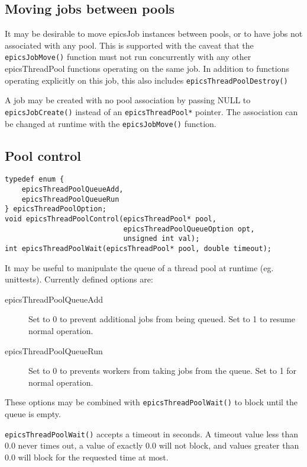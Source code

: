 \subsection{Moving jobs between pools}

It may be desirable to move epicsJob instances between pools, or to
have jobs not associated with any pool. This is supported with the
caveat that the \verb|epicsJobMove()| function must not run concurrently
with any other epicsThreadPool functions operating on the same job.
In addition to functions operating explicitly on this job, this also includes
\verb|epicsThreadPoolDestroy()|

A job may be created with no pool association by passing NULL to \verb|epicsJobCreate()|
instead of an \verb|epicsThreadPool*| pointer. The association can be changed
at runtime with the \verb|epicsJobMove()| function.


\subsection{Pool control}

\begin{verbatim}
typedef enum {
    epicsThreadPoolQueueAdd,
    epicsThreadPoolQueueRun
} epicsThreadPoolOption;
void epicsThreadPoolControl(epicsThreadPool* pool,
                            epicsThreadPoolQueueOption opt,
                            unsigned int val);
int epicsThreadPoolWait(epicsThreadPool* pool, double timeout);
\end{verbatim}



It may be useful to manipulate the queue of a thread pool at runtime
(eg. unittests). Currently defined options are:
\begin{description}
\item [{epicsThreadPoolQueueAdd}] Set to 0 to prevent additional jobs from
being queued. Set to 1 to resume normal operation.
\item [{epicsThreadPoolQueueRun}] Set to 0 to prevents workers from taking
jobs from the queue. Set to 1 for normal operation.
\end{description}
These options may be combined with \verb|epicsThreadPoolWait()| to block
until the queue is empty.

\verb|epicsThreadPoolWait()| accepts a timeout in seconds. A timeout value
less than 0.0 never times out, a value of exactly 0.0 will not block,
and values greater than 0.0 will block for the requested time at most.

